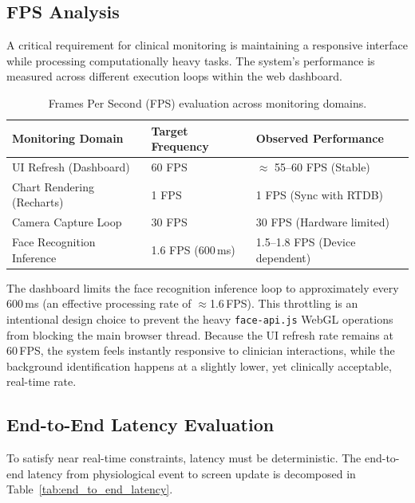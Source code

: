 \subsection{FPS Analysis}
A critical requirement for clinical monitoring is maintaining a responsive interface while processing computationally heavy tasks. The system's performance is measured across different execution loops within the web dashboard.

\begin{table}[H]
	\centering
	\caption{Frames Per Second (FPS) evaluation across monitoring domains.}
	\label{tab:fps_analysis}
	\begin{tabularx}{\linewidth}{lXX}
		\toprule
		\textbf{Monitoring Domain} & \textbf{Target Frequency} & \textbf{Observed Performance} \\
		\midrule
		UI Refresh (Dashboard)     & 60 FPS                    & $\approx$ 55--60 FPS (Stable) \\
		Chart Rendering (Recharts) & 1 FPS                     & 1 FPS (Sync with RTDB)        \\
		Camera Capture Loop        & 30 FPS                    & 30 FPS (Hardware limited)     \\
		Face Recognition Inference & 1.6 FPS (600\,ms)         & 1.5--1.8 FPS (Device dependent) \\
		\bottomrule
	\end{tabularx}
\end{table}

The dashboard limits the face recognition inference loop to approximately every 600\,ms (an effective processing rate of $\approx$1.6\,FPS). This throttling is an intentional design choice to prevent the heavy \texttt{face-api.js} WebGL operations from blocking the main browser thread. Because the UI refresh rate remains at 60\,FPS, the system feels instantly responsive to clinician interactions, while the background identification happens at a slightly lower, yet clinically acceptable, real-time rate.

\subsection{End-to-End Latency Evaluation}
To satisfy near real-time constraints, latency must be deterministic. The end-to-end latency from physiological event to screen update is decomposed in Table~\ref{tab:end_to_end_latency}.

